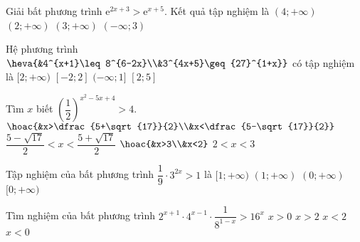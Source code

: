 \begin{ex}%
	Giải bất phương trình $\mathrm{e}^{2x+3}>\mathrm{e}^{x+5}$. Kết quả tập nghiệm là
	\choice
	{$(4;+\infty)$}
	{\True $(2;+\infty)$}
	{$(3;+\infty)$}
	{$(-\infty;3)$}
\end{ex}
\begin{ex}%
	Hệ phương trình $\heva{&4^{x+1}\leq 8^{6-2x}\\&3^{4x+5}\geq{27}^{1+x}}$ có tập nghiệm là
	\choice
	{$[2;+\infty)$}
	{\True $[-2;2]$}
	{$(-\infty;1]$}
	{$[2;5]$}
\end{ex}
\begin{ex}%
	Tìm $x$ biết $\left(\dfrac{1}{2}\right)^{x^2-5x+4}>4$. 
	\choice
	{$\hoac{&x>\dfrac{5+\sqrt{17}}{2}\\&x<\dfrac{5-\sqrt{17}}{2}}$}
	{$\dfrac{5-\sqrt{17}}{2}<x<\dfrac{5+\sqrt{17}}{2}$}
	{$\hoac{&x>3\\&x<2}$}
	{\True $2<x<3$}
\end{ex}
\begin{ex}%
	Tập nghiệm của bất phương trình $\dfrac{1}{9}\cdot 3^{2x}>1$ là 
	\choice
	{$[1;+\infty)$}
	{\True $(1;+\infty)$}
	{$(0;+\infty)$}
	{$[0;+\infty)$}
\end{ex}
\begin{ex}%
	Tìm nghiệm của bất phương trình $2^{x+1}\cdot 4^{x-1}\cdot\dfrac{1}{8^{1-x}}>16^x$ 
	\choice
	{$x>0$}
	{\True $x>2$}
	{$x<2$}
	{$x<0$}
\end{ex}
